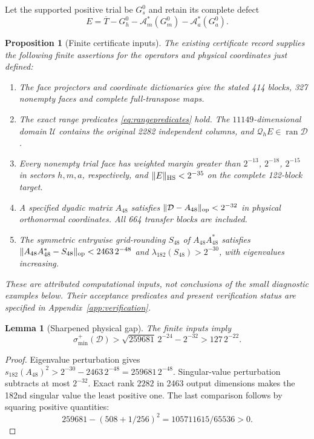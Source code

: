 \documentclass[11pt,a4paper]{article}
\newtheorem{proposition}[theorem]{Proposition}
\newtheorem{lemma}[theorem]{Lemma}
\theoremstyle{definition}\newtheorem{definition}[theorem]{Definition}
\theoremstyle{remark}\newtheorem{remark}[theorem]{Remark}
\DeclareMathOperator{\ran}{ran}\DeclareMathOperator{\vecop}{vec}
\numberwithin{equation}{section}
\begin{document}
Let the supported positive trial be $G_s^0$ and retain its complete defect
\begin{equation}
E=\overline T-G_h^0-\mathcal A_m^*(G_m^0)-\mathcal A_a^*(G_a^0).
\label{eq:defect}
\end{equation}

\begin{proposition}[Finite certificate inputs]\label{prop:finite}
The existing certificate record \cite{certificate} supplies the following
finite assertions for the operators and physical coordinates just defined:
\begin{enumerate}[label=(\roman*)]
\item The face projectors and coordinate dictionaries give the stated
414 blocks, 327 nonempty faces and complete full-transpose maps.
\item The exact range predicates \eqref{eq:rangepredicates} hold.
The $11149$-dimensional domain $\mathcal U$ contains the original
2282 independent columns, and $\mathcal Q_hE\in\ran\mathcal D$.
\item Every nonempty trial face has weighted margin greater than
$2^{-13}$, $2^{-18}$, $2^{-15}$ in sectors $h,m,a$, respectively,
and $\|E\|_{\rm HS}<2^{-35}$ on the complete 122-block target.
\item A specified dyadic matrix $A_{48}$ satisfies
$\|\mathcal D-A_{48}\|_{\rm op}<2^{-32}$ in physical orthonormal
coordinates. All 664 transfer blocks are included.
\item The symmetric entrywise grid-rounding $S_{48}$ of
$A_{48}A_{48}^*$ satisfies
$\|A_{48}A_{48}^*-S_{48}\|_{\rm op}<2463\,2^{-48}$ and
$\lambda_{182}(S_{48})>2^{-30}$, with eigenvalues increasing.
\end{enumerate}
These are attributed computational inputs, not conclusions of the
small diagnostic examples below. Their acceptance predicates and
present verification status are specified in
Appendix~\ref{app:verification}.
\end{proposition}

\begin{lemma}[Sharpened physical gap]\label{lem:gap}
The finite inputs imply
\begin{equation}
\sigma_{\min}^+(\mathcal D)>
\sqrt{259681}\,2^{-24}-2^{-32}>127\,2^{-22}.
\label{eq:gap}
\end{equation}
\end{lemma}
\begin{proof}
Eigenvalue perturbation gives
$s_{182}(A_{48})^2>2^{-30}-2463\,2^{-48}=259681\,2^{-48}$.
Singular-value perturbation subtracts at most $2^{-32}$.
Exact rank $2282$ in 2463 output dimensions makes the 182nd
singular value the least positive one. The last comparison follows
by squaring positive quantities:
\[
259681-(508+1/256)^2=105711615/65536>0.
\]
\end{proof}
\end{document}

